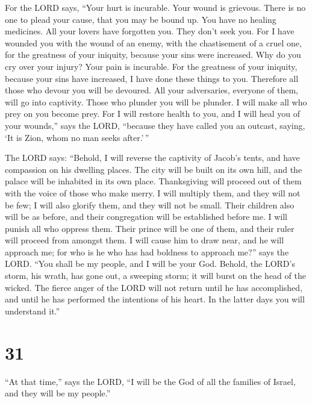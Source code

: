  For the LORD says, ``Your hurt is incurable. Your wound is
grievous.  There is no one to plead your cause, that you
may be bound up. You have no healing medicines.  All your
lovers have forgotten you. They don't seek you. For I have wounded you
with the wound of an enemy, with the chastisement of a cruel one, for
the greatness of your iniquity, because your sins were increased.
 Why do you cry over your injury? Your pain is incurable.
For the greatness of your iniquity, because your sins have increased, I
have done these things to you.  Therefore all those who
devour you will be devoured. All your adversaries, everyone of them,
will go into captivity. Those who plunder you will be plunder. I will
make all who prey on you become prey.  For I will restore
health to you, and I will heal you of your wounds,'' says the LORD,
``because they have called you an outcast, saying, `It is Zion, whom no
man seeks after.'\,''

 The LORD says: ``Behold, I will reverse the captivity of
Jacob's tents, and have compassion on his dwelling places. The city will
be built on its own hill, and the palace will be inhabited in its own
place.  Thanksgiving will proceed out of them with the
voice of those who make merry. I will multiply them, and they will not
be few; I will also glorify them, and they will not be small.
 Their children also will be as before, and their
congregation will be established before me. I will punish all who
oppress them.  Their prince will be one of them, and their
ruler will proceed from amongst them. I will cause him to draw near, and
he will approach me; for who is he who has had boldness to approach
me?'' says the LORD.  ``You shall be my people, and I will
be your God.  Behold, the LORD's storm, his wrath, has gone
out, a sweeping storm; it will burst on the head of the wicked.
 The fierce anger of the LORD will not return until he has
accomplished, and until he has performed the intentions of his heart. In
the latter days you will understand it.''

\hypertarget{section-30}{%
\section{31}\label{section-30}}

 ``At that time,'' says the LORD, ``I will be the God of all
the families of Israel, and they will be my people.''

